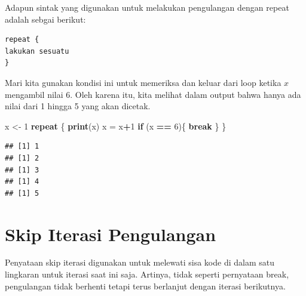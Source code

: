\documentclass[
]{book}
\newenvironment{Shaded}{\begin{snugshade}}{\end{snugshade}}
\newcommand{\ControlFlowTok}[1]{\textcolor[rgb]{0.13,0.29,0.53}{\textbf{#1}}}
\newcommand{\DecValTok}[1]{\textcolor[rgb]{0.00,0.00,0.81}{#1}}
\newcommand{\FunctionTok}[1]{\textcolor[rgb]{0.13,0.29,0.53}{\textbf{#1}}}
\newcommand{\NormalTok}[1]{#1}
\newcommand{\OtherTok}[1]{\textcolor[rgb]{0.56,0.35,0.01}{#1}}
\newcommand{\SpecialCharTok}[1]{\textcolor[rgb]{0.81,0.36,0.00}{\textbf{#1}}}
\begin{document}
Adapun sintak yang digunakan untuk melakukan pengulangan dengan repeat adalah sebgai berikut:

\begin{verbatim}
repeat {
lakukan sesuatu
}
\end{verbatim}

Mari kita gunakan kondisi ini untuk memeriksa dan keluar dari loop ketika \(x\) mengambil nilai 6. Oleh karena itu, kita melihat dalam output bahwa hanya ada nilai dari 1 hingga 5 yang akan dicetak.

\begin{Shaded}
\begin{Highlighting}[]
\NormalTok{x }\OtherTok{\textless{}{-}} \DecValTok{1}
\ControlFlowTok{repeat}\NormalTok{ \{}
  \FunctionTok{print}\NormalTok{(x)}
\NormalTok{    x }\OtherTok{=}\NormalTok{ x}\SpecialCharTok{+}\DecValTok{1}
  \ControlFlowTok{if}\NormalTok{ (x }\SpecialCharTok{==} \DecValTok{6}\NormalTok{)\{}
  \ControlFlowTok{break}
\NormalTok{  \}}
\NormalTok{\}}
\end{Highlighting}
\end{Shaded}

\begin{verbatim}
## [1] 1
## [1] 2
## [1] 3
## [1] 4
## [1] 5
\end{verbatim}

\hypertarget{skip-iterasi-pengulangan}{%
\section{Skip Iterasi Pengulangan}\label{skip-iterasi-pengulangan}}

Penyataan skip iterasi digunakan untuk melewati sisa kode di dalam satu lingkaran untuk iterasi saat ini saja. Artinya, tidak seperti pernyataan break, pengulangan tidak berhenti tetapi terus berlanjut dengan iterasi berikutnya.
\end{document}
